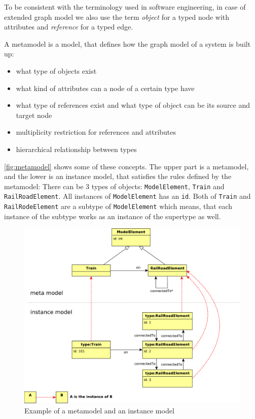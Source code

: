 To be consistent with the terminology used in software engineering, in case of  extended graph model we also use the term \emph{object} for a typed node with attributes and \emph{reference} for a typed edge. 

A metamodel is a model, that defines how the graph model of a system is built up:
\begin{itemize}
	\item what type of objects exist
	\item what kind of attributes can a node of a certain type have
	\item what type of references exist and what type of object can be its source and target node
	\item multiplicity restriction for references and attributes
	\item hierarchical relationship between types
\end{itemize}

\autoref{fig:metamodel} shows some of these concepts. The upper part is a metamodel, and the lower is an instance model, that satisfies the rules defined by the metamodel: There can be 3 types of objects: \texttt{ModelElement}, \texttt{Train} and \texttt{RailRoadElement}. All instances of \texttt{ModelElement} has an \texttt{id}. Both of \texttt{Train} and \texttt{RailRodeElement} are a subtype of \texttt{ModelElement} which means, that each instance of the subtype works as an instance of the supertype as well.
\begin{figure}[h]
	\begin{center}
		\includegraphics[width=\textwidth]{figures/metamodel.pdf}
		\caption{ Example of a metamodel and an instance model }
		\label{fig:metamodel}
	\end{center}
\end{figure}



